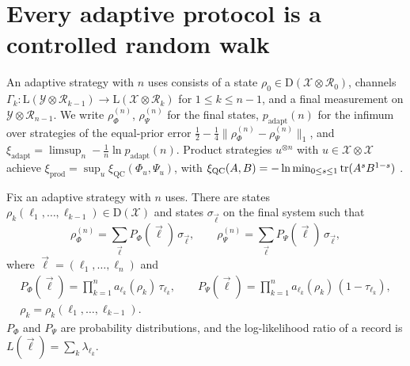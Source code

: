 \section{Every adaptive protocol is a controlled random walk}\label{chn:sec:walk}

An adaptive strategy with $n$ uses consists of a state $\rho_0\in\mathrm D(\mathcal X\otimes\mathcal R_0)$, channels $\Gamma_k:\mathrm L(\mathcal Y\otimes\mathcal R_{k-1})\to\mathrm L(\mathcal X\otimes\mathcal R_k)$ for $1\le k\le n-1$, and a final measurement on $\mathcal Y\otimes\mathcal R_{n-1}$. We write $\rho^{(n)}_\Phi$, $\rho^{(n)}_\Psi$ for the final states, $p_{\mathrm{adapt}}(n)$ for the infimum over strategies of the equal-prior error $\tfrac12-\tfrac14\|\rho^{(n)}_\Phi-\rho^{(n)}_\Psi\|_1$, and $\xi_{\mathrm{adapt}}=\limsup_n-\frac1n\ln p_{\mathrm{adapt}}(n)$. Product strategies $u^{\otimes n}$ with $u\in\mathcal X\otimes\mathcal X$ achieve $\xi_{\mathrm{prod}}=\sup_u\xi_{\mathrm{QC}}(\Phi_u,\Psi_u)$, with $\xi_{\mathrm{QC}}(A,B)=-\ln\min_{0\le s\le1}\operatorname{tr}(A^sB^{1-s})$ \cite{AudenaertChernoff2007,NussbaumSzkola2009}.

\begin{proposition}\label{chn:prop:walk}
Fix an adaptive strategy with $n$ uses. There are states $\rho_k(\ell_1,\dots,\ell_{k-1})\in\mathrm D(\mathcal X)$ and states $\sigma_{\vec\ell}$ on the final system such that
\[
\rho^{(n)}_\Phi=\sum_{\vec\ell}P_\Phi(\vec\ell)\,\sigma_{\vec\ell},\qquad\rho^{(n)}_\Psi=\sum_{\vec\ell}P_\Psi(\vec\ell)\,\sigma_{\vec\ell},
\]
where $\vec\ell=(\ell_1,\dots,\ell_n)$ and
\begin{equation}\label{chn:eq:walk}
\begin{gathered}
P_\Phi(\vec\ell)=\prod_{k=1}^na_{\ell_k}(\rho_k)\,\tau_{\ell_k},\qquad P_\Psi(\vec\ell)=\prod_{k=1}^na_{\ell_k}(\rho_k)\,(1-\tau_{\ell_k}),\\
\rho_k=\rho_k(\ell_1,\dots,\ell_{k-1}).
\end{gathered}
\end{equation}
$P_\Phi$ and $P_\Psi$ are probability distributions, and the log-likelihood ratio of a record is $L(\vec\ell)=\sum_k\lambda_{\ell_k}$.
\end{proposition}

